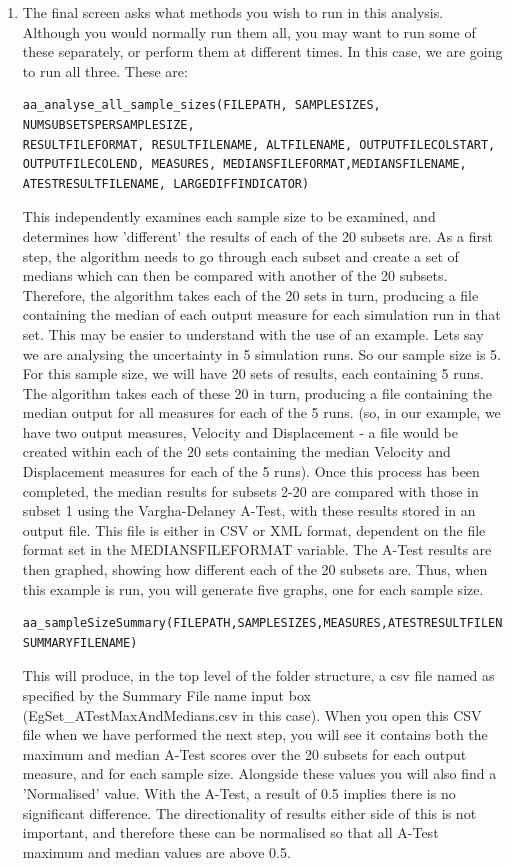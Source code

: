 \documentclass[a4paper,11pt]{article}
\begin{document}
\begin{enumerate}
\item The final screen asks what methods you wish to run in this analysis. Although you would normally run them all, you may want to run some of these separately, or perform them at different times. In this case, we are going to run all three. These are:

\begin{verbatim}
aa_analyse_all_sample_sizes(FILEPATH, SAMPLESIZES, NUMSUBSETSPERSAMPLESIZE,
RESULTFILEFORMAT, RESULTFILENAME, ALTFILENAME, OUTPUTFILECOLSTART,
OUTPUTFILECOLEND, MEASURES, MEDIANSFILEFORMAT,MEDIANSFILENAME,
ATESTRESULTFILENAME, LARGEDIFFINDICATOR)
\end{verbatim}

This independently examines each sample size to be examined, and determines how 'different' the results of each of the 20 subsets are.  As a first step, the algorithm needs to go through each subset and create a set of medians which can then be compared with another of the 20 subsets. Therefore, the algorithm takes each of the 20 sets in turn, producing a file containing the median of each output measure for each simulation run in that set. This may be easier to understand with the use of an example. Lets say we are analysing the uncertainty in 5 simulation runs. So our sample size is 5.  For this sample size, we will have 20 sets of results, each containing 5 runs. The algorithm takes each of these 20 in turn, producing a file containing the median output for all measures for each of the 5 runs. (so, in our example, we have two output measures, Velocity and Displacement - a file would be created within each of the 20 sets containing the median Velocity and Displacement measures for each of the 5 runs).  Once this process has been completed, the median results for subsets 2-20 are compared with those in subset 1 using the Vargha-Delaney A-Test, with these results stored in an output file. This file is either in CSV or XML format, dependent on the file format set in the MEDIANSFILEFORMAT variable. The A-Test results are then graphed, showing how different each of the 20 subsets are. Thus, when this example is run, you will generate five graphs, one for each sample size.  

\begin{verbatim}
aa_sampleSizeSummary(FILEPATH,SAMPLESIZES,MEASURES,ATESTRESULTFILENAME,
SUMMARYFILENAME)
\end{verbatim}

This will produce, in the top level of the folder structure, a csv file named as specified by the Summary File name input box  (EgSet\_ATestMaxAndMedians.csv in this case). When you open this CSV file when we have performed the next step, you will see it contains both the maximum and median A-Test scores over the 20 subsets for each output measure, and for each sample size. Alongside these values you will also find a 'Normalised' value.  With the A-Test, a result of 0.5 implies there is no significant difference.  The directionality of results either side of this is not important, and therefore these can be normalised so that all A-Test maximum and median values are above 0.5.


\end{enumerate}
\end{document}
